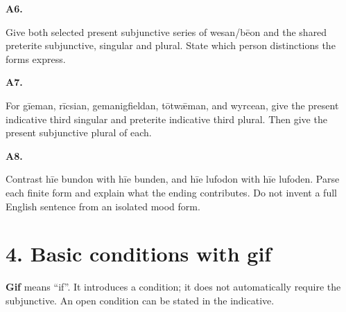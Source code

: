 \par\begin{minipage}{\linewidth}\raggedright
\textbf{A6.}

Give both selected present subjunctive series of wesan/\allowbreak{}bēon and the shared preterite subjunctive, singular and plural. State which person distinctions the forms express.

\end{minipage}\par\addvspace{4pt}

\par\begin{minipage}{\linewidth}\raggedright
\textbf{A7.}

For gīeman, rīcsian, gemanigfieldan, tōtwǣman, and wyrcean, give the present indicative third singular and preterite indicative third plural. Then give the present subjunctive plural of each.

\end{minipage}\par\addvspace{4pt}

\par\begin{minipage}{\linewidth}\raggedright
\textbf{A8.}

Contrast hīe bundon with hīe bunden, and hīe lufodon with hīe lufoden. Parse each finite form and explain what the ending contributes. Do not invent a full English sentence from an isolated mood form.

\end{minipage}\par\addvspace{4pt}

\section*{4. Basic conditions with gif}

\textbf{Gif} means “if”. It introduces a condition; it does not automatically require the subjunctive. An open condition can be stated in the indicative.

